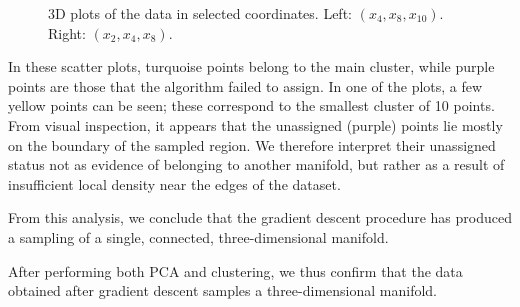 \documentclass[11pt]{article}
\begin{document}
\begin{figure}
			\caption{3D plots of the data in selected coordinates. Left: $(x_4, x_8, x_{10})$. Right: $(x_2, x_4, x_8)$.}
			\label{3dplots}
		\end{figure}
		
		In these scatter plots, turquoise points belong to the main cluster, while purple points are those that the algorithm failed to assign. In one of the plots, a few yellow points can be seen; these correspond to the smallest cluster of 10 points. From visual inspection, it appears that the unassigned (purple) points lie mostly on the boundary of the sampled region. We therefore interpret their unassigned status not as evidence of belonging to another manifold, but rather as a result of insufficient local density near the edges of the dataset.
		
		From this analysis, we conclude that the gradient descent procedure has produced a sampling of a single, connected, three-dimensional manifold.
		
		\vspace{0.5em}
		
		After performing both PCA and clustering, we thus confirm that the data obtained after gradient descent samples a three-dimensional manifold.
\end{document}
